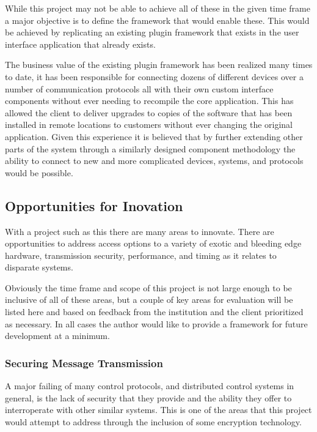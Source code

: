 \documentclass[11pt]{article}
\begin{document}
      While this project may not be able to achieve all of these in the given
      time frame a major objective is to define the framework that would enable
      these. This would be achieved by replicating an existing plugin framework
      that exists in the user interface application that already exists.

      The business value of the existing plugin framework has been realized many
      times to date, it has been responsible for connecting dozens of different
      devices over a number of communication protocols all with their own
      custom interface components without ever needing to recompile the core
      application. This has allowed the client to deliver upgrades to copies of
      the software that has been installed in remote locations to customers
      without ever changing the original application. Given this experience it
      is believed that by further extending other parts of the system through a
      similarly designed component methodology the ability to connect to new
      and more complicated devices, systems, and protocols would be possible.

    \subsection{Opportunities for Inovation}\label{sec:soln-innov}

      With a project such as this there are many areas to innovate. There are
      opportunities to address access options to a variety of exotic and
      bleeding edge hardware, transmission security, performance, and timing
      as it relates to disparate systems.

      Obviously the time frame and scope of this project is not large enough to
      be inclusive of all of these areas, but a couple of key areas for
      evaluation will be listed here and based on feedback from the institution
      and the client prioritized as necessary. In all cases the author would
      like to provide a framework for future development at a minimum.

      \subsubsection{Securing Message Transmission}\label{sec:soln-innov-sec}

        A major failing of many control protocols, and distributed control
        systems in general, is the lack of security that they provide and the
        ability they offer to interroperate with other similar systems. This is
        one of the areas that this project would attempt to address through the
        inclusion of some encryption technology.
\end{document}
